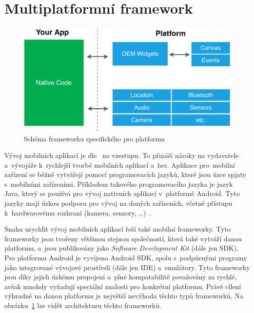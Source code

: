 \section{Multiplatformní framework}

\begin{figure}
    \centering
    \includegraphics[width=\linewidth]{assets/technology-research/framework/platform_sdk.pdf}
    \caption{Schéma frameworku specifického pro platformu~\cite{hackernoon_flutter}}
    \label{fig:framework_platform}
\end{figure}

Vývoj mobilních aplikací je dle~\cite{wepc_video_game_statistics} na vzestupu.
To přináší nároky na \linebreak vydavatele a~vývojáře k~rychlejší tvorbě mobilních
aplikací a~her.
Aplikace pro~mobilní zařízení se běžně vytvářejí pomocí programovacích jazyků,
\linebreak které jsou úzce spjaty
s~mobilními zařízeními.
Příkladem takového programovacího jazyka je jazyk Java,
který se používá pro vývoj nativních aplikací
v~platformě Android.
Tyto jazyky mají úzkou podporu pro vývoj na daných zařízeních,
včetně přístupu k~hardwarovému rozhraní (kamera, senzory, \dots{})~\cite{dashmagazine_mobile_frameworks}.

Snahu urychlit vývoj mobilních aplikací řeší také mobilní frameworky.
Tyto frameworky jsou tvořeny většinou stejnou společností,
která také vytváří danou platformu,
a~jsou publikovány jako \emph{Software Development Kit} (dále jen SDK).
Pro platformu Android je vyvíjeno Android SDK,
spolu s~podpůrnými programy jako integrované vývojové prostředí
(dále jen IDE) a~emulátory.
Tyto frameworky jsou díky jejich úzkému propojení a~plné kompatabilitě
považovány za rychlé,
avšak mnohdy vyžadují speciální znalosti pro konkrétní platformu.
Právě cílení výhradně na danou platformu je největší nevýhoda těchto typů
frameworků.
Na obrázku~\ref{fig:framework_platform} lze vidět architekturu těchto
frameworků.~\cite{dashmagazine_mobile_frameworks}

